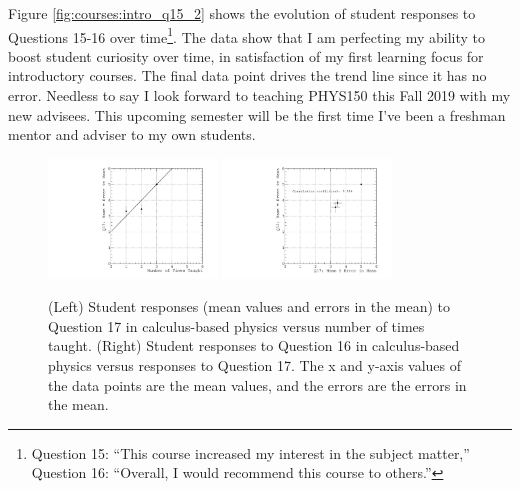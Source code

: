 \documentclass[../../main.tex]{subfiles}
\begin{document}
Figure \ref{fig:courses:intro_q15_2} shows the evolution of student responses to Questions 15-16 over time\footnote{Question 15: ``This course increased my interest in the subject matter,'' Question 16: ``Overall, I would recommend this course to others.''}.  The data show that I am perfecting my ability to boost student curiosity over time, in satisfaction of my first learning focus for introductory courses.  The final data point drives the trend line since it has no error.  Needless to say I look forward to teaching PHYS150 this Fall 2019 with my new advisees.  This upcoming semester will be the first time I've been a freshman mentor and adviser to my own students.

\begin{figure}
\centering
\includegraphics[width=0.4\textwidth]{Q17_calculus_based.pdf}
\includegraphics[width=0.4\textwidth]{Q16_Q17_calculus_based.pdf}
\caption{\label{fig:courses:intro_q17_2}  (Left) Student responses (mean values and errors in the mean) to Question 17 in calculus-based physics versus number of times taught. (Right) Student responses to Question 16 in calculus-based physics versus responses to Question 17.  The x and y-axis values of the data points are the mean values, and the errors are the errors in the mean.}
\end{figure}
\end{document}
